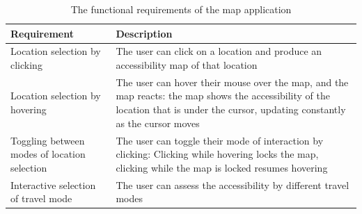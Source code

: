 \begin{table}[H]
	\centering
	\begin{tabular}{ | L{0.3\textwidth} | L{0.6\textwidth} | }
		\hline
		Requirement
		& Description
		\\
		\hline
		\hline
		Location selection by clicking
		& The user can click on a location and produce an accessibility map of that location
		\\
		\hline
		Location selection by hovering
		& The user can hover their mouse over the map, and the map reacts:
		the map shows the accessibility of the location that is under the cursor,
		updating constantly as the cursor moves
		\\
		\hline
		Toggling between modes of location selection
		& The user can toggle their mode of interaction by clicking:
		Clicking while hovering locks the map, clicking while the map is locked resumes hovering
		\\
		\hline
		Interactive selection of travel mode
		& The user can assess the accessibility by different travel modes
		\\
		\hline
	\end{tabular}
	\caption{The functional requirements of the map application}
	\label{tab:functional requirements}
\end{table}

